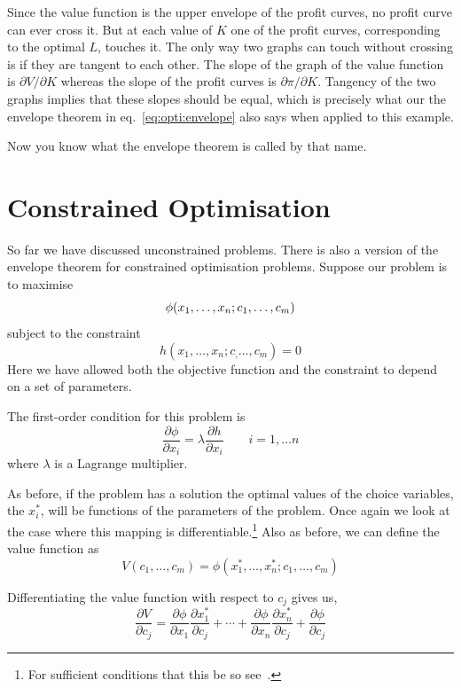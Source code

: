 \documentclass[11pt,reqno,openany]{amsbook}
\begin{document}
Since the value function is the upper envelope of the profit curves,
no profit curve can ever cross it. But at each value of $K$ one of the
profit curves, corresponding to the optimal $L$, touches it. The only
way two graphs can touch without crossing is if they are tangent to
each other. The slope of the graph of the value function is $\partial
V/\partial K$ whereas the slope of the profit curves is $\partial
\pi/\partial K$. Tangency of the two graphs implies that these slopes
should be equal, which is precisely what our the envelope theorem in
eq.~\eqref{eq:opti:envelope} also says when applied to this example.

Now you know what the envelope theorem is called by that name.

\section{Constrained Optimisation}
So far we have discussed unconstrained problems. There is also a
version of the envelope theorem for constrained optimisation problems.
Suppose our problem is to maximise
\begin{equation*}
\phi(x_1,\ldots,x_n;c_1,\ldots,c_m)\\
\end{equation*}
subject to the constraint
\begin{equation}\label{eq:opti:constraint}
h(x_1,\ldots,x_n;c_,\ldots,c_m)=0
\end{equation}
Here we have allowed both the objective function and the constraint to
depend on a set of parameters.

The first-order condition for this problem is
\begin{equation}\label{eq:opti:cfoc}
\frac{\partial \phi}{\partial x_i}
=\lambda \frac{\partial h}{\partial  x_i}
\qquad i=1,\ldots n
\end{equation}
where $\lambda$ is a Lagrange multiplier.

As before, if the problem has a solution the optimal values
of the choice variables, the $x_i^*$, will be functions of
the parameters of the problem. Once again we look at the
case where this mapping is differentiable.\footnote{For
  sufficient conditions that this be so
  see~\cite[Section~11.7]{luenberger-lin-nonlin}.} Also as
before, we can define the value function as
\[V(c_1,\ldots,c_m)=\phi(x_1^*,\ldots,x_n^*;c_1,\ldots,c_m)\]

Differentiating the value function with respect to $c_j$ gives us,
\begin{equation}\label{eq:opti:value-chain}
\frac{\partial V}{\partial c_j}=
\frac{\partial \phi}{\partial x_1}\frac{\partial x^*_1}{\partial c_j}
+\cdots
+\frac{\partial \phi}{\partial x_n}\frac{\partial x^*_n}{\partial c_j}
+\frac{\partial \phi}{\partial c_j}
\end{equation}
\end{document}

